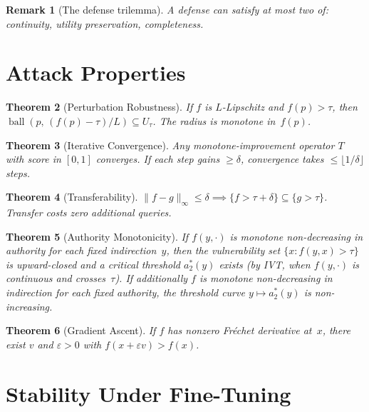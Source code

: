 \documentclass[11pt]{article}
\newtheorem{theorem}{Theorem}[section]
\newtheorem{remark}[theorem]{Remark}
\begin{document}
\begin{remark}[The defense trilemma]
A defense can satisfy at most two of: continuity, utility preservation,
completeness.
\end{remark}


\section{Attack Properties}
\label{app:attacks}

\begin{theorem}[Perturbation Robustness]
\label{thm:lipschitz}
If $f$ is $L$-Lipschitz and $f(p)>\tau$, then
$\operatorname{ball}(p,\, (f(p)-\tau)/L) \subseteq U_\tau$.
The radius is monotone in~$f(p)$.
\end{theorem}

\begin{theorem}[Iterative Convergence]
\label{thm:convergence}
Any monotone-improvement operator $T$ with score in $[0,1]$ converges.
If each step gains $\geq \delta$, convergence takes
$\leq \lfloor 1/\delta \rfloor$ steps.
\end{theorem}

\begin{theorem}[Transferability]
\label{thm:transfer}
$\|f-g\|_\infty \leq \delta \implies
\{f > \tau+\delta\} \subseteq \{g > \tau\}$.
Transfer costs zero additional queries.
\end{theorem}

\begin{theorem}[Authority Monotonicity]
\label{thm:authority}
If $f(y,\cdot)$ is monotone non-decreasing in authority for each fixed
indirection~$y$, then the vulnerability set $\{x : f(y,x) > \tau\}$ is
upward-closed and a critical threshold $a^*_2(y)$ exists (by IVT, when
$f(y,\cdot)$ is continuous and crosses~$\tau$). If additionally $f$ is
monotone non-decreasing in indirection for each fixed authority, the
threshold curve $y \mapsto a^*_2(y)$ is non-increasing.
\end{theorem}

\begin{theorem}[Gradient Ascent]
\label{thm:gradient}
If $f$ has nonzero Fr\'{e}chet derivative at~$x$, there exist $v$ and
$\varepsilon > 0$ with $f(x + \varepsilon v) > f(x)$.
\end{theorem}


\section{Stability Under Fine-Tuning}
\label{app:stability}
\end{document}
